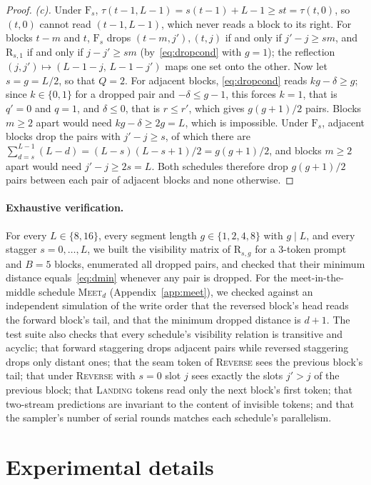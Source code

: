 \documentclass{article}
\theoremstyle{definition}
\theoremstyle{remark}
\newcommand{\name}[1]{\textup{\textsc{#1}}}
\newcommand{\rev}{\name{Reverse}\xspace}
\newcommand{\landing}{\name{Landing}\xspace}
\newcommand{\meet}[1]{\name{Meet}$_{#1}$}
\newcommand{\Rsg}[2]{\mathrm{R}_{#1,#2}}
\newcommand{\Fs}[1]{\mathrm{F}_{#1}}
\begin{document}
\begin{proof}
\emph{(c).}
Under $\Fs{s}$, $\tau(t-1,L-1)=s(t-1)+L-1\ge st=\tau(t,0)$, so $(t,0)$ cannot read $(t-1,L-1)$, which never reads a block to its right.
For blocks $t-m$ and $t$, $\Fs{s}$ drops $(t-m,j'),(t,j)$ if and only if $j'-j\ge sm$, and $\Rsg{s}{1}$ if and only if $j-j'\ge sm$ (by~\eqref{eq:dropcond} with $g=1$); the reflection $(j,j')\mapsto(L-1-j,\,L-1-j')$ maps one set onto the other.
Now let $s=g=L/2$, so that $Q=2$.
For adjacent blocks, \eqref{eq:dropcond} reads $kg-\delta\ge g$; since $k\in\{0,1\}$ for a dropped pair and $-\delta\le g-1$, this forces $k=1$, that is $q'=0$ and $q=1$, and $\delta\le0$, that is $r\le r'$, which gives $g(g+1)/2$ pairs.
Blocks $m\ge2$ apart would need $kg-\delta\ge 2g=L$, which is impossible.
Under $\Fs{s}$, adjacent blocks drop the pairs with $j'-j\ge s$, of which there are $\sum_{d=s}^{L-1}(L-d)=(L-s)(L-s+1)/2=g(g+1)/2$, and blocks $m\ge2$ apart would need $j'-j\ge 2s=L$.
Both schedules therefore drop $g(g+1)/2$ pairs between each pair of adjacent blocks and none otherwise.
\end{proof}

\paragraph{Exhaustive verification.}
For every $L\in\{8,16\}$, every segment length $g\in\{1,2,4,8\}$ with $g\mid L$, and every stagger $s=0,\dots,L$, we built the visibility matrix of $\Rsg{s}{g}$ for a 3-token prompt and $B=5$ blocks, enumerated all dropped pairs, and checked that their minimum distance equals~\eqref{eq:dmin} whenever any pair is dropped.
For the meet-in-the-middle schedule \meet{d} (Appendix~\ref{app:meet}), we checked against an independent simulation of the write order that the reversed block's head reads the forward block's tail, and that the minimum dropped distance is $d+1$.
The test suite also checks that every schedule's visibility relation is transitive and acyclic; that forward staggering drops adjacent pairs while reversed staggering drops only distant ones; that the seam token of \rev sees the previous block's tail; that under \rev with $s=0$ slot $j$ sees exactly the slots $j'>j$ of the previous block; that \landing tokens read only the next block's first token; that two-stream predictions are invariant to the content of invisible tokens; and that the sampler's number of serial rounds matches each schedule's parallelism.

\section{Experimental details}
\label{app:details}
\end{document}

